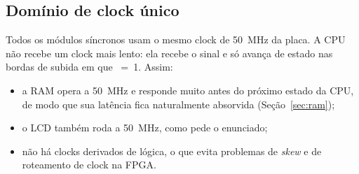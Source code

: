 \subsection{Domínio de clock único}

Todos os módulos síncronos usam o mesmo clock de \SI{50}{\mega\hertz} da placa.
A CPU não recebe um clock mais lento: ela recebe o sinal  e só avança de
estado nas bordas de subida em que ~=~1. Assim:

\begin{itemize}[nosep]
  \item a RAM opera a \SI{50}{\mega\hertz} e responde muito antes do próximo
        estado da CPU, de modo que sua latência fica naturalmente absorvida
        (Seção~\ref{sec:ram});
  \item o LCD também roda a \SI{50}{\mega\hertz}, como pede o enunciado;
  \item não há clocks derivados de lógica, o que evita problemas de
        \emph{skew} e de roteamento de clock na FPGA.
\end{itemize}
